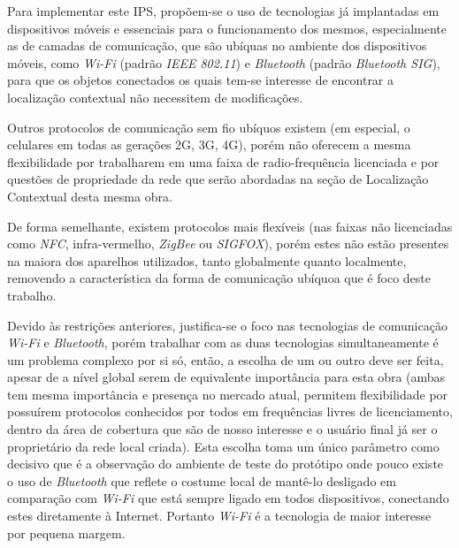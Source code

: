 Para implementar este IPS, propõem-se o uso de tecnologias já implantadas em
dispositivos móveis e essenciais para o funcionamento dos mesmos, especialmente
as de camadas de comunicação, que são ubíquas no ambiente dos dispositivos
móveis, como \emph{Wi-Fi} (padrão \emph{IEEE 802.11}) e \emph{Bluetooth}
(padrão \emph{Bluetooth SIG}), para que os objetos conectados os quais tem-se
interesse de encontrar a localização contextual não necessitem de modificações.

Outros protocolos de comunicação sem fio ubíquos existem (em especial, o
celulares em todas as gerações 2G, 3G, 4G), porém não oferecem a mesma
flexibilidade por trabalharem em uma faixa de radio-frequência licenciada e por
questões de propriedade da rede que serão abordadas na seção de Localização
Contextual desta mesma obra.

De forma semelhante, existem protocolos mais flexíveis (nas faixas não
licenciadas como \emph{NFC}, infra-vermelho, \emph{ZigBee} ou
\emph{SIGFOX}), porém estes não estão presentes na maiora dos aparelhos
utilizados, tanto globalmente quanto localmente, removendo a característica da
forma de comunicação ubíquoa que é foco deste trabalho.

Devido às restrições anteriores, justifica-se o foco nas tecnologias de
comunicação \emph{Wi-Fi} e \emph{Bluetooth}, porém trabalhar com as duas
tecnologias simultaneamente é um problema complexo por si só, então, a escolha
de um ou outro deve ser feita, apesar de a nível global serem de equivalente importância para
esta obra (ambas tem mesma importância e presença no mercado atual, permitem
flexibilidade por possuírem protocolos conhecidos por todos em frequências
livres de licenciamento, dentro da área de cobertura que são de nosso interesse
e o usuário final já ser o proprietário da rede local criada).
Esta escolha toma um único parâmetro como decisivo que é a observação do
ambiente de teste do protótipo onde pouco existe o uso de \emph{Bluetooth}  que
reflete o costume local de mantê-lo desligado em comparação com \emph{Wi-Fi}
que está sempre ligado em todos dispositivos, conectando estes diretamente à
Internet. Portanto \emph{Wi-Fi} é a tecnologia de maior interesse por pequena
margem.
